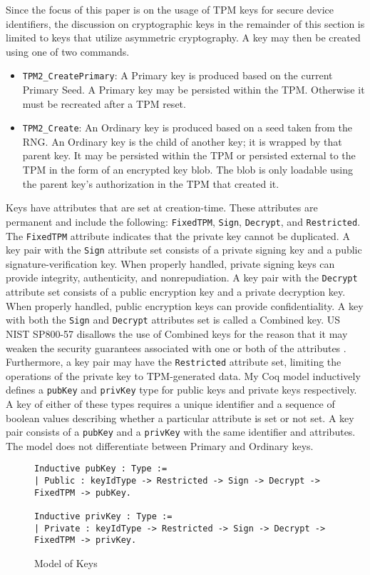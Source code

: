 Since the focus of this paper is on the usage of TPM keys for secure device identifiers, the discussion on cryptographic keys in the remainder of this section is limited to keys that utilize asymmetric cryptography.  A key may then be created using one of two commands.
\begin{itemize}
  \item \verb|TPM2_CreatePrimary|: A Primary key is produced based on the current Primary Seed. A Primary key may be persisted within the TPM. Otherwise it must be recreated after a TPM reset.
  \item \verb|TPM2_Create|: An Ordinary key is produced based on a seed taken from the RNG. An Ordinary key is the child of another key; it is wrapped by that parent key. It may be persisted within the TPM or persisted external to the TPM in the form of an encrypted key blob. The blob is only loadable using the parent key's authorization in the TPM that created it.
\end{itemize}
Keys have attributes that are set at creation-time. These attributes are permanent and include the following: \verb|FixedTPM|, \verb|Sign|, \verb|Decrypt|, and \verb|Restricted|. The \verb|FixedTPM| attribute indicates that the private key cannot be duplicated. A key pair with the \verb|Sign| attribute set consists of a private signing key and a public signature-verification key. When properly handled, private signing keys can provide integrity, authenticity, and nonrepudiation. A key pair with the \verb|Decrypt| attribute set consists of a public encryption key and a private decryption key. When properly handled, public encryption keys can provide confidentiality. A key with both the \verb|Sign| and \verb|Decrypt| attributes set is called a Combined key. US NIST SP800-57 disallows the use of Combined keys for the reason that it may weaken the security guarantees associated with one or both of the attributes \cite{KeyManagement}. Furthermore, a key pair may have the \verb|Restricted| attribute set, limiting the operations of the private key to TPM-generated data.
My Coq model inductively defines a \verb|pubKey| and \verb|privKey| type for public keys and private keys respectively. A key of either of these types requires a unique identifier and a sequence of boolean values describing whether a particular attribute is set or not set. A key pair consists of a \verb|pubKey| and a \verb|privKey| with the same identifier and attributes. The model does not differentiate between Primary and Ordinary keys.
\begin{figure}[h]
\begin{lstlisting}[language=Coq]
Inductive pubKey : Type :=
| Public : keyIdType -> Restricted -> Sign -> Decrypt -> FixedTPM -> pubKey.

Inductive privKey : Type :=
| Private : keyIdType -> Restricted -> Sign -> Decrypt -> FixedTPM -> privKey.
\end{lstlisting}

\caption{Model of Keys}
\end{figure}


